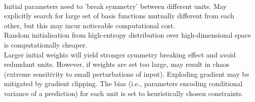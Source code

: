 \begin{remark} \\
Initial parameters need to 'break symmetry' between different units. May explicitly search for large set of basis functions mutually different from each other, but this may incur noticeable computational cost.\\
Random initialisation from high-entropy distribution over high-dimensional space is computationally cheaper.\\
Larger initial weights will yield stronger symmetry breaking effect and avoid redundant units. However, if weights are set too large, may result in chaos (extreme sensitivity to small perturbations of input). Exploding gradient may be mitigated by gradient clipping. The bias (i.e., parameters encoding conditional variance of a prediction) for each unit is set to heuristically chosen constraints.
\end{remark}

